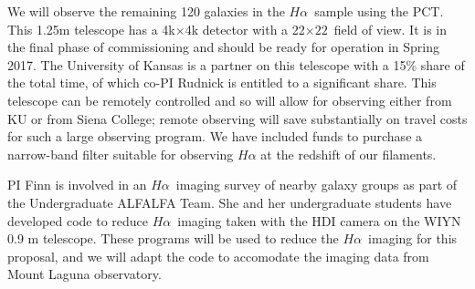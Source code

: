 \documentclass[11pt, preprint]{aastex}
\newcommand{\ha}{$H\alpha$}
\begin{document}
We will observe the remaining 120 galaxies in the \ha \ sample using the
PCT.  This 1.25m telescope has a 4k$\times$4k detector with a  22\arcmin$\times
22$\arcmin \ field of view.  It is in the final phase of commissioning
and should be ready for operation in Spring 2017.  The University of
Kansas is a partner on this telescope with a 15\% share of the total
time, of which co-PI Rudnick is entitled to a significant share.  This
telescope can be remotely controlled and so will allow for observing
either from KU or from Siena College; remote observing will save substantially on travel costs for such a large observing program.
We have included funds to purchase a narrow-band filter suitable for observing $H\alpha$  at the redshift of our filaments.  


PI Finn is involved in an \ha \ imaging survey of nearby galaxy groups
as part of the Undergraduate ALFALFA Team.  She and her undergraduate
students have developed code to reduce \ha \ imaging taken with the HDI camera on
the WIYN 0.9 m telescope.  These programs will be used to reduce the
\ha \ imaging for this proposal, and we will adapt the code to
accomodate the imaging data from Mount Laguna observatory.

\end{document}
